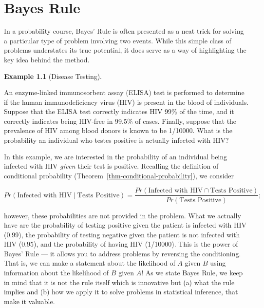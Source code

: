 \documentclass[
  letterpaper,
  DIV=11,
  numbers=noendperiod]{scrreprt}
\theoremstyle{definition}
\newtheorem{example}{Example}[chapter]
\theoremstyle{definition}
\theoremstyle{plain}
\theoremstyle{remark}
\begin{document}
\hypertarget{sec-bayesrule}{%
\chapter{Bayes Rule}\label{sec-bayesrule}}

\providecommand{\norm}[1]{\lVert#1\rVert}
\providecommand{\abs}[1]{\lvert#1\rvert}
\providecommand{\iid}{\stackrel{\text{IID}}{\sim}}
\providecommand{\ind}{\stackrel{\text{Ind}}{\sim}}

\providecommand{\bm}[1]{\mathbf{#1}}
\providecommand{\bs}[1]{\boldsymbol{#1}}
\providecommand{\bbeta}{\bs{\beta}}

\providecommand{\Ell}{\mathcal{L}}
\providecommand{\indep}{\perp\negthickspace\negmedspace\perp}

In a probability course, Bayes' Rule is often presented as a neat trick
for solving a particular type of problem involving two events. While
this simple class of problems understates its true potential, it does
serve as a way of highlighting the key idea behind the method.

\begin{example}[Disease
Testing]\protect\hypertarget{exm-disease}{}\label{exm-disease}

An enzyme-linked immunosorbent assay (ELISA) test is performed to
determine if the human immunodeficiency virus (HIV) is present in the
blood of individuals. Suppose that the ELISA test correctly indicates
HIV 99\% of the time, and it correctly indicates being HIV-free in
99.5\% of cases. Finally, suppose that the prevalence of HIV among blood
donors is known to be 1/10000. What is the probability an individual who
testes positive is actually infected with HIV?

\end{example}

In this example, we are interested in the probability of an individual
being infected with HIV \emph{given} their test is positive. Recalling
the definition of conditional probability
(Theorem~\ref{thm-conditional-probability}), we consider

\[Pr(\text{Infected with HIV} \mid \text{Tests Positive}) = \frac{Pr(\text{Infected with HIV} \cap \text{Tests Positive})}{Pr(\text{Tests Positive})};\]

however, these probabilities are not provided in the problem. What we
actually have are the probability of testing positive given the patient
is infected with HIV (0.99), the probability of testing negative given
the patient is not infected with HIV (0.95), and the probability of
having HIV (1/10000). This is the power of Bayes' Rule --- it allows you
to address problems by reversing the conditioning. That is, we can make
a statement about the likelihood of \(A\) given \(B\) using information
about the likelihood of \(B\) given \(A\)! As we state Bayes Rule, we
keep in mind that it is not the rule itself which is innovative but (a)
what the rule implies and (b) how we apply it to solve problems in
statistical inference, that make it valuable.
\end{document}
